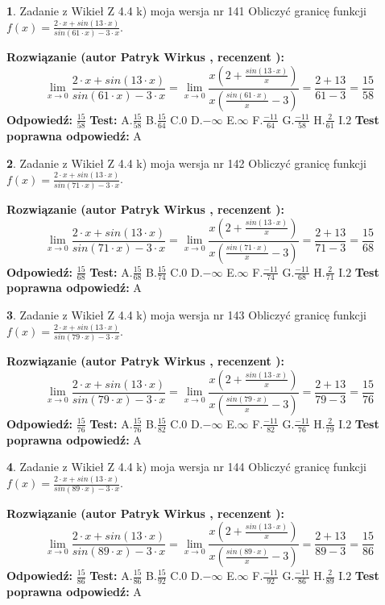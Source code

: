 \documentclass[12pt, a4paper]{article}
\theoremstyle{definition} %
\newtheorem{zad}{}
\newcommand{\zadStart}[1]{\begin{zad}#1\newline}
\newcommand{\zadStop}{\end{zad}}
\newcommand{\rozwStart}[2]{\noindent \textbf{Rozwiązanie (autor #1 , recenzent #2): }\newline}
\newcommand{\rozwStop}{\newline}
\newcommand{\odpStart}{\noindent \textbf{Odpowiedź:}\newline}
\newcommand{\odpStop}{\newline}
\newcommand{\testStart}{\noindent \textbf{Test:}\newline}
\newcommand{\testStop}{\newline}
\newcommand{\kluczStart}{\noindent \textbf{Test poprawna odpowiedź:}\newline}
\newcommand{\kluczStop}{\newline}
\begin{document}
\zadStart{Zadanie z Wikieł Z 4.4 k) moja wersja nr 141}
Obliczyć granicę funkcji $f(x)=\frac{2\cdot x +sin(13\cdot x)}{sin(61\cdot x) -3\cdot x}$.
\zadStop
\rozwStart{Patryk Wirkus}{}
$$\lim\limits_{x\to 0}\frac{2\cdot x +sin(13\cdot x)}{sin(61\cdot x) -3\cdot x}
=\lim\limits_{x\to 0}\frac{x(2+\frac{sin(13\cdot x)}{x})}{x(\frac{sin(61\cdot x)}{x}-3)}
=\frac{2+13}{61-3} = \frac{15}{58}$$
\rozwStop
\odpStart
$\frac{15}{58}$
\odpStop
\testStart
A.$\frac{15}{58}$
B.$\frac{15}{64}$
C.$0$
D.$-\infty$
E.$\infty$
F.$\frac{-11}{64}$
G.$\frac{-11}{58}$
H.$\frac{2}{61}$
I.$2$
\testStop
\kluczStart
A
\kluczStop



\zadStart{Zadanie z Wikieł Z 4.4 k) moja wersja nr 142}
Obliczyć granicę funkcji $f(x)=\frac{2\cdot x +sin(13\cdot x)}{sin(71\cdot x) -3\cdot x}$.
\zadStop
\rozwStart{Patryk Wirkus}{}
$$\lim\limits_{x\to 0}\frac{2\cdot x +sin(13\cdot x)}{sin(71\cdot x) -3\cdot x}
=\lim\limits_{x\to 0}\frac{x(2+\frac{sin(13\cdot x)}{x})}{x(\frac{sin(71\cdot x)}{x}-3)}
=\frac{2+13}{71-3} = \frac{15}{68}$$
\rozwStop
\odpStart
$\frac{15}{68}$
\odpStop
\testStart
A.$\frac{15}{68}$
B.$\frac{15}{74}$
C.$0$
D.$-\infty$
E.$\infty$
F.$\frac{-11}{74}$
G.$\frac{-11}{68}$
H.$\frac{2}{71}$
I.$2$
\testStop
\kluczStart
A
\kluczStop



\zadStart{Zadanie z Wikieł Z 4.4 k) moja wersja nr 143}
Obliczyć granicę funkcji $f(x)=\frac{2\cdot x +sin(13\cdot x)}{sin(79\cdot x) -3\cdot x}$.
\zadStop
\rozwStart{Patryk Wirkus}{}
$$\lim\limits_{x\to 0}\frac{2\cdot x +sin(13\cdot x)}{sin(79\cdot x) -3\cdot x}
=\lim\limits_{x\to 0}\frac{x(2+\frac{sin(13\cdot x)}{x})}{x(\frac{sin(79\cdot x)}{x}-3)}
=\frac{2+13}{79-3} = \frac{15}{76}$$
\rozwStop
\odpStart
$\frac{15}{76}$
\odpStop
\testStart
A.$\frac{15}{76}$
B.$\frac{15}{82}$
C.$0$
D.$-\infty$
E.$\infty$
F.$\frac{-11}{82}$
G.$\frac{-11}{76}$
H.$\frac{2}{79}$
I.$2$
\testStop
\kluczStart
A
\kluczStop



\zadStart{Zadanie z Wikieł Z 4.4 k) moja wersja nr 144}
Obliczyć granicę funkcji $f(x)=\frac{2\cdot x +sin(13\cdot x)}{sin(89\cdot x) -3\cdot x}$.
\zadStop
\rozwStart{Patryk Wirkus}{}
$$\lim\limits_{x\to 0}\frac{2\cdot x +sin(13\cdot x)}{sin(89\cdot x) -3\cdot x}
=\lim\limits_{x\to 0}\frac{x(2+\frac{sin(13\cdot x)}{x})}{x(\frac{sin(89\cdot x)}{x}-3)}
=\frac{2+13}{89-3} = \frac{15}{86}$$
\rozwStop
\odpStart
$\frac{15}{86}$
\odpStop
\testStart
A.$\frac{15}{86}$
B.$\frac{15}{92}$
C.$0$
D.$-\infty$
E.$\infty$
F.$\frac{-11}{92}$
G.$\frac{-11}{86}$
H.$\frac{2}{89}$
I.$2$
\testStop
\kluczStart
A
\kluczStop
\end{document}
